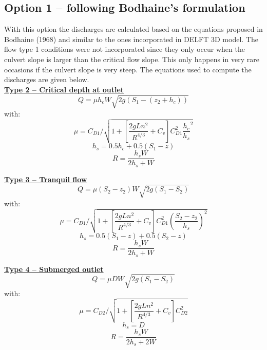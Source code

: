 \subsection{Option 1 -- following Bodhaine's formulation}

With this option the discharges are calculated based on the equations proposed in Bodhaine (1968)
and similar to the ones incorporated in DELFT 3D model.
The flow type 1 conditions were not incorporated since they only
occur when the culvert slope is larger than the critical flow slope.
This only happens in very rare occasions if the culvert slope is very steep.
The equations used to compute the discharges are given below.\\

\underline{\textbf{Type 2 -- Critical depth at outlet}}\\
\begin{equation}
Q = \mu h_c W \sqrt{2g(S_1-(z_2+h_c))}
\end{equation}
with:
\begin{equation}
\mu = C_{D1}/\sqrt{1+\left[\dfrac{2gLn^2}{R^{4/3}} +C_v\right] C_{D1}^2 \dfrac{h_c}{h_s}^2}
\end{equation}
\begin{equation}
h_s=0.5h_c+0.5(S_1-z)
\end{equation}
\begin{equation}
R=\dfrac{h_s W}{2h_s+W}
\end{equation}

\underline{\textbf{Type 3 -- Tranquil flow}}\\
\begin{equation}
Q=\mu (S_2-z_2)W\sqrt{2g(S_1-S_2 )}
\end{equation}
with:
\begin{equation}
\mu = C_{D1}/\sqrt{ 1+\left[\dfrac{2gLn^2}{R^{4/3}} +C_v \right] C_{D1}^2 \left(\dfrac{S_2-z_2}{h_s}\right)^2}
\end{equation}
\begin{equation}
h_s=0.5(S_1-z)+0.5(S_2-z)
\end{equation}
\begin{equation}
  R=\dfrac{h_sW}{2h_s+W}
\end{equation}

\underline{\textbf{Type 4 -- Submerged outlet}}\\
\begin{equation}
Q =\mu D W \sqrt{2g(S_1-S_2)}
\end{equation}
with:
\begin{equation}
\mu = C_{D2}/\sqrt{1+\left[\dfrac{2gLn^2}{R^{4/3}} +C_v \right] C_{D2}^2}
\end{equation}
\begin{equation}
h_s=D
\end{equation}
\begin{equation}
R=\dfrac{h_s W}{2h_s+2W}
\end{equation}

